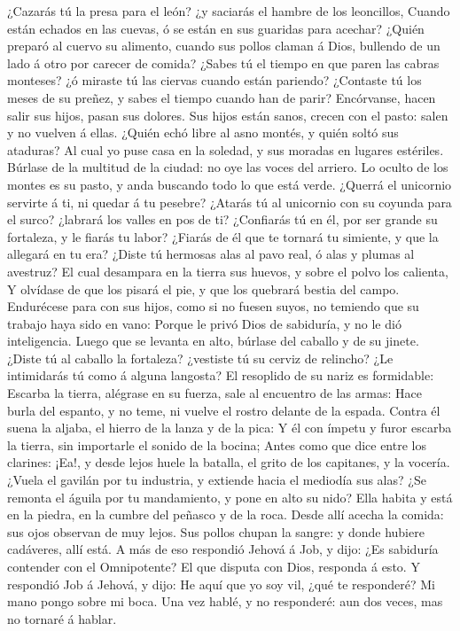  ¿Cazarás tú la presa para el león? ¿y saciarás el hambre de
los leoncillos,  Cuando están echados en las cuevas, ó se
están en sus guaridas para acechar?  ¿Quién preparó al
cuervo su alimento, cuando sus pollos claman á Dios, bullendo de un lado
á otro por carecer de comida?  ¿Sabes tú el tiempo en que
paren las cabras monteses? ¿ó miraste tú las ciervas cuando están
pariendo?  ¿Contaste tú los meses de su preñez, y sabes el
tiempo cuando han de parir?  Encórvanse, hacen salir sus
hijos, pasan sus dolores.  Sus hijos están sanos, crecen con
el pasto: salen y no vuelven á ellas.  ¿Quién echó libre al
asno montés, y quién soltó sus ataduras?  Al cual yo puse
casa en la soledad, y sus moradas en lugares estériles. 
Búrlase de la multitud de la ciudad: no oye las voces del arriero.
 Lo oculto de los montes es su pasto, y anda buscando todo
lo que está verde.  ¿Querrá el unicornio servirte á ti, ni
quedar á tu pesebre?  ¿Atarás tú al unicornio con su
coyunda para el surco? ¿labrará los valles en pos de ti? 
¿Confiarás tú en él, por ser grande su fortaleza, y le fiarás tu labor?
 ¿Fiarás de él que te tornará tu simiente, y que la
allegará en tu era?  ¿Diste tú hermosas alas al pavo real,
ó alas y plumas al avestruz?  El cual desampara en la
tierra sus huevos, y sobre el polvo los calienta,  Y
olvídase de que los pisará el pie, y que los quebrará bestia del campo.
 Endurécese para con sus hijos, como si no fuesen suyos, no
temiendo que su trabajo haya sido en vano:  Porque le privó
Dios de sabiduría, y no le dió inteligencia.  Luego que se
levanta en alto, búrlase del caballo y de su jinete. 
¿Diste tú al caballo la fortaleza? ¿vestiste tú su cerviz de relincho?
 ¿Le intimidarás tú como á alguna langosta? El resoplido de
su nariz es formidable:  Escarba la tierra, alégrase en su
fuerza, sale al encuentro de las armas:  Hace burla del
espanto, y no teme, ni vuelve el rostro delante de la espada.
 Contra él suena la aljaba, el hierro de la lanza y de la
pica:  Y él con ímpetu y furor escarba la tierra, sin
importarle el sonido de la bocina;  Antes como que dice
entre los clarines: ¡Ea!, y desde lejos huele la batalla, el grito de
los capitanes, y la vocería.  ¿Vuela el gavilán por tu
industria, y extiende hacia el mediodía sus alas?  ¿Se
remonta el águila por tu mandamiento, y pone en alto su nido? Ella
habita y está en la piedra, en la cumbre del peñasco y de la roca. Desde
allí acecha la comida: sus ojos observan de muy lejos. Sus pollos chupan
la sangre: y donde hubiere cadáveres, allí está. A más de eso respondió
Jehová á Job, y dijo: ¿Es sabiduría contender con el Omnipotente? El que
disputa con Dios, responda á esto. Y respondió Job á Jehová, y dijo: He
aquí que yo soy vil, ¿qué te responderé? Mi mano pongo sobre mi boca.
Una vez hablé, y no responderé: aun dos veces, mas no tornaré á hablar.

